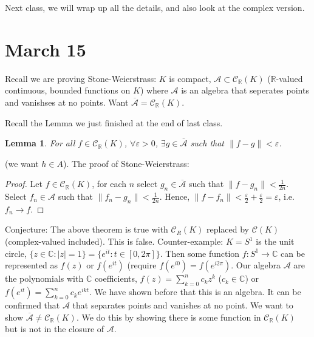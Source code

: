 \documentclass{article}
\theoremstyle{plain}
\newtheorem{lemma}{Lemma}
\theoremstyle{remark}
\newcommand{\R}{{\mathbb R}}
\newcommand{\C}{{\mathbb C}}
\newcommand{\ep}{{\varepsilon}}
\begin{document}
Next class, we will wrap up all the details,
and also look at the complex version.


\section{March 15}
Recall we are proving Stone-Weierstrass:
$K$ is compact, $\mathcal{A} \subset \mathcal{C}_\R(K)$
($\R$-valued continuous, bounded functions on $K$)
where $\mathcal{A}$ is an algebra that seperates points and vanishses at no points.
Want $\overline{\mathcal{A}} = \mathcal{C}_\R(K)$.

Recall the Lemma we just finished at the end of last class.
\begin{lemma}
	For all $f \in \mathcal{C}_\R(K)$, $\forall \ep > 0$,
	$\exists g \in \overline{\mathcal{A}}$ such that
	$\lVert f - g \rVert < \ep$.
\end{lemma}
(we want $h \in A$).
The proof of Stone-Weierstrass:
\begin{proof}
	Let $f \in \mathcal{C}_\R(K)$, for each $n$ select $g_n \in \overline{\mathcal{A}}$
	such that $\lVert f - g_n \rVert < \frac{1}{2n}$.
	Select $f_n \in \mathcal{A}$ such that $\lVert f_n - g_n \rVert < \frac{1}{2n}$.
	Hence, $\lVert f - f_n \rVert < \frac{\ep}{2} + \frac{\ep}{2} = \ep$,
	i.e. $f_n \to f$.
\end{proof}

Conjecture: The above theorem is true with $\mathcal{C}_R(K)$
replaced by $\mathcal{C}(K)$ (complex-valued included).
This is false.
Counter-example:
$K = S^1$ is the unit circle, $\{z \in \C \colon |z| = 1\}
= \{e^{it} \colon t \in [0,2\pi]\}$.
Then some function $f \colon S^1 \to \C$ can be represented as
$f(z)$ or $f(e^{it})$ (require $f(e^{i0}) = f(e^{i2\pi})$.
Our algebra $\mathcal{A}$ are the polynomials with $\C$ coefficients,
$f(z) = \sum_{k=0}^n c_k z^k$ ($c_k \in \C$) or
$f(e^{it}) = \sum_{k=0}^n c_k e^{ikt}$.
We have shown before that this is an algebra.
It can be confirmed that $\mathcal{A}$ that separates points and vanishes at no point.
We want to show $\overline{\mathcal{A}} \neq \mathcal{C}_\R(K)$.
We do this by showing there is some function in $\mathcal{C}_\R(K)$
but is not in the closure of $\mathcal{A}$.
\end{document}
